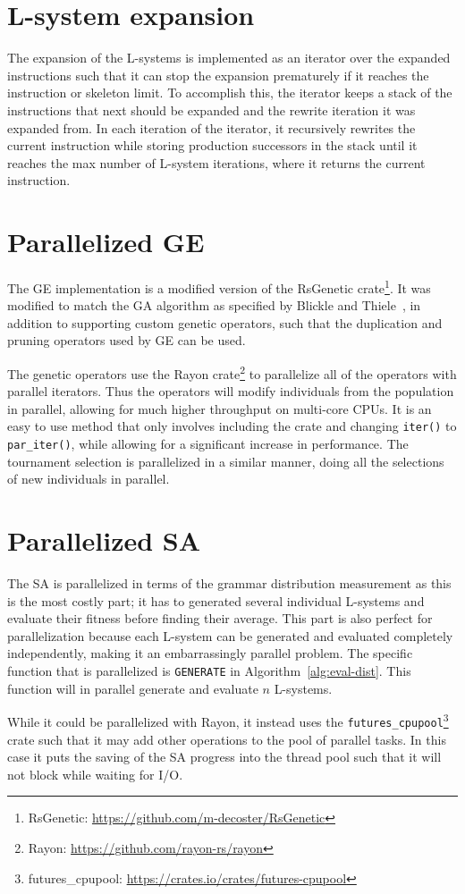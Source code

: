 \section{L-system expansion}
The expansion of the \glspl{L-system} is implemented as an iterator over the expanded instructions such that it can stop the expansion prematurely if it reaches the instruction or skeleton limit.
To accomplish this, the iterator keeps a stack of the instructions that next should be expanded and the rewrite iteration it was expanded from.
In each iteration of the iterator, it recursively rewrites the current instruction while storing production successors in the stack until it reaches the max number of \gls{L-system} iterations, where it returns the current instruction.

\section[Parallelized GE]{Parallelized \gls{GE}}
The \gls{GE} implementation is a modified version of the RsGenetic crate\footnote{RsGenetic: \url{https://github.com/m-decoster/RsGenetic}}.
It was modified to match the \gls{GA} algorithm as specified by Blickle and Thiele~\cite{1995Blickle}, in addition to supporting custom genetic operators, such that the duplication and pruning operators used by \gls{GE} can be used.

The genetic operators use the Rayon crate\footnote{Rayon: \url{https://github.com/rayon-rs/rayon}} to parallelize all of the operators with parallel iterators.
Thus the operators will modify individuals from the population in parallel, allowing for much higher throughput on multi-core CPUs.
It is an easy to use method that only involves including the crate and changing \texttt{iter()} to \texttt{par\_iter()}, while allowing for a significant increase in performance.
The tournament selection is parallelized in a similar manner, doing all the selections of new individuals in parallel.

\section[Parallelized SA]{Parallelized \gls{SA}}
The \gls{SA} is parallelized in terms of the grammar distribution measurement as this is the most costly part; it has to generated several individual \glspl{L-system} and evaluate their fitness before finding their average.
This part is also perfect for parallelization because each \gls{L-system} can be generated and evaluated completely independently, making it an embarrassingly parallel problem.
The specific function that is parallelized is \texttt{GENERATE} in Algorithm~\ref{alg:eval-dist}.
This function will in parallel generate and evaluate $n$ \glspl{L-system}.

While it could be parallelized with Rayon, it instead uses the \texttt{futures\_cpupool}\footnote{futures\_cpupool: \url{https://crates.io/crates/futures-cpupool}} crate such that it may add other operations to the pool of parallel tasks.
In this case it puts the saving of the \gls{SA} progress into the thread pool such that it will not block while waiting for I/O.
